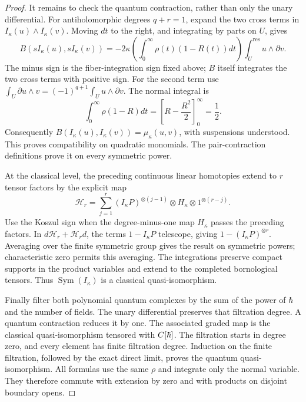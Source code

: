 \begin{proof}
It remains to check the quantum contraction, rather than only the
unary differential.  For antiholomorphic degrees $q+r=1$, expand the
two cross terms in $I_\kappa(u)\wedge I_\kappa(v)$.
Moving $dt$ to the right, and integrating by parts on $U$, gives
\[
 B(sI_\kappa(u),sI_\kappa(v))
 =-2\kappa\left(\int_0^\infty\rho(t)(1-R(t))dt\right)
                          \int_U^{\mathrm{res}}u\wedge\partial v.
\]
The minus sign is the fiber-integration sign fixed above;
$B$ itself integrates the two cross terms with positive sign.
For the second term use
$\int_U\partial u\wedge v=(-1)^{q+1}\int_Uu\wedge\partial v$.
The normal integral is
\[
 \int_0^\infty\rho(1-R)dt
  =\left[R-\frac{R^2}{2}\right]_0^\infty=\frac12.
\]
Consequently $B(I_\kappa(u),I_\kappa(v))=\mu_\kappa(u,v)$, with
suspensions understood.  This proves compatibility on quadratic
monomials.  The pair-contraction definitions prove it on every
symmetric power.

At the classical level, the preceding continuous linear homotopies
extend to $r$ tensor factors by the explicit map
\[
 \mathscr H_r=\sum_{j=1}^r
 (I_\kappa P)^{\otimes(j-1)}\otimes H_\kappa
                       \otimes1^{\otimes(r-j)}.
\]
Use the Koszul sign when the degree-minus-one map $H_\kappa$ passes
the preceding factors.  In $d\mathscr H_r+\mathscr H_rd$, the terms
$1-I_\kappa P$ telescope, giving $1-(I_\kappa P)^{\otimes r}$.
Averaging
over the finite symmetric group gives the result on symmetric powers;
characteristic zero permits this averaging.  The integrations preserve
compact supports in the product variables and extend to the completed
bornological tensors.  Thus $\operatorname{Sym}(I_\kappa)$ is a
classical quasi-isomorphism.

Finally filter both polynomial quantum complexes by the sum of the
power of $\hbar$ and the number of fields.  The unary differential
preserves that filtration degree.  A quantum contraction reduces it
by one.  The associated graded map is the classical
quasi-isomorphism tensored with $C[\hbar]$.  The filtration starts
in degree zero, and every element has finite filtration degree.
Induction on the finite filtration, followed by the exact direct
limit, proves the quantum quasi-isomorphism.
All formulas use the same $\rho$ and integrate only the normal
variable.  They therefore commute with extension by zero and with
products on disjoint boundary opens.
\end{proof}

